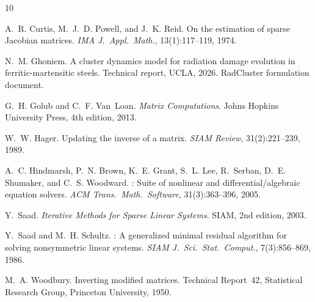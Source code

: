 \documentclass[11pt]{article}
\begin{document}

\begin{thebibliography}{10}

A.~R. Curtis, M.~J.~D. Powell, and J.~K. Reid.
\newblock On the estimation of sparse {J}acobian matrices.
\newblock \emph{IMA J.\ Appl.\ Math.}, 13(1):117--119, 1974.

N.~M. Ghoniem.
\newblock A cluster dynamics model for radiation damage evolution in
  ferritic-martensitic steels.
\newblock Technical report, UCLA, 2026.
\newblock RadCluster formulation document.

G.~H. Golub and C.~F. Van~Loan.
\newblock \emph{Matrix Computations}.
\newblock Johns Hopkins University Press, 4th edition, 2013.

W.~W. Hager.
\newblock Updating the inverse of a matrix.
\newblock \emph{SIAM Review}, 31(2):221--239, 1989.

A.~C. Hindmarsh, P.~N. Brown, K.~E. Grant, S.~L. Lee, R.~Serban,
  D.~E. Shumaker, and C.~S. Woodward.
: Suite of nonlinear and differential/algebraic equation
  solvers.
\newblock \emph{ACM Trans.\ Math.\ Software}, 31(3):363--396, 2005.

Y.~Saad.
\newblock \emph{Iterative Methods for Sparse Linear Systems}.
\newblock SIAM, 2nd edition, 2003.

Y.~Saad and M.~H. Schultz.
: A generalized minimal residual algorithm for solving
  nonsymmetric linear systems.
\newblock \emph{SIAM J.\ Sci.\ Stat.\ Comput.}, 7(3):856--869, 1986.

M.~A. Woodbury.
\newblock Inverting modified matrices.
\newblock Technical Report~42, Statistical Research Group, Princeton
  University, 1950.

\end{thebibliography}
\end{document}
